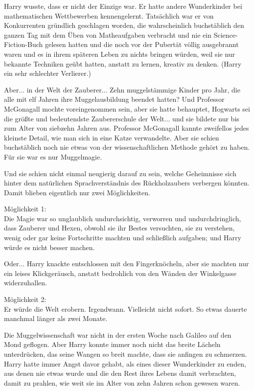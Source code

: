 Harry wusste, dass er nicht der Einzige war. Er hatte andere Wunderkinder bei
mathematischen Wettbewerben kennengelernt. Tatsächlich war er von Konkurrenten
gründlich geschlagen worden, die wahrscheinlich buchstäblich den ganzen Tag mit
dem Üben von Matheaufgaben verbracht und nie ein Science-Fiction-Buch gelesen
hatten und die noch vor der Pubertät völlig ausgebrannt waren und es in ihrem
späteren Leben zu nichts bringen würden, weil sie nur bekannte Techniken geübt
hatten, anstatt zu lernen, kreativ zu denken. (Harry ein sehr schlechter
Verlierer.)

Aber... in der Welt der Zauberer... Zehn muggelstämmige Kinder pro Jahr, die
alle mit elf Jahren ihre Muggelausbildung beendet hatten? Und Professor
McGonagall mochte voreingenommen sein, aber sie hatte behauptet, Hogwarts sei
die größte und bedeutendste Zaubererschule der Welt... und sie bildete nur bis
zum Alter von siebzehn Jahren aus. Professor McGonagall kannte zweifellos jedes
kleinste Detail, wie man sich in eine Katze verwandelte. Aber sie schien
buchstäblich noch nie etwas von der wissenschaftlichen Methode gehört zu haben.
Für sie war es nur Muggelmagie.

Und sie schien nicht einmal neugierig darauf zu sein, welche Geheimnisse sich
hinter dem natürlichen Sprachverständnis des Rückholzaubers verbergen könnten.
Damit blieben eigentlich nur zwei Möglichkeiten.

Möglichkeit 1:\\
Die Magie war so unglaublich undurchsichtig, verworren und undurchdringlich,
dass Zauberer und Hexen, obwohl sie ihr Bestes versuchten, sie zu verstehen,
wenig oder gar keine Fortschritte machten und schließlich aufgaben; und Harry
würde es nicht besser machen.

Oder... Harry knackte entschlossen mit den Fingerknöcheln, aber sie machten nur
ein leises Klickgeräusch, anstatt bedrohlich von den Wänden der Winkelgasse
widerzuhallen.

Möglichkeit 2:\\
Er würde die Welt erobern. Irgendwann. Vielleicht nicht sofort. So etwas dauerte
manchmal länger als zwei Monate.

Die Muggelwissenschaft war nicht in der ersten Woche nach Galileo auf den Mond
geflogen. Aber Harry konnte immer noch nicht das breite Lächeln unterdrücken,
das seine Wangen so breit machte, dass sie anfingen zu schmerzen. Harry hatte
immer Angst davor gehabt, als eines dieser Wunderkinder zu enden, aus denen nie
etwas wurde und die den Rest ihres Lebens damit verbrachten, damit zu prahlen,
wie weit sie im Alter von zehn Jahren schon gewesen waren.

